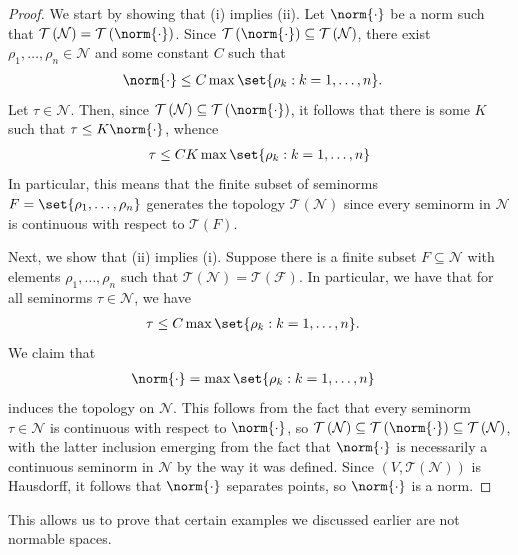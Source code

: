 \documentclass[10pt]{mypackage}
\begin{document}
\begin{proof}
  We start by showing that (i) implies (ii). Let $\norm{\cdot}$ be a norm such that $ \mathcal{T}\left( \mathcal{N} \right) = \mathcal{T}\left( \norm{\cdot} \right) $. Since $ \mathcal{T}\left( \norm{\cdot} \right)\subseteq \mathcal{T}\left( \mathcal{N} \right) $, there exist $\rho_1,\dots,\rho_n\in \mathcal{N}$ and some constant $C$ such that
  \begin{align*}
    \norm{\cdot} &\leq C\max\set{\rho_k : k=1,\dots,n}.
  \end{align*}
  Let $\tau\in \mathcal{N}$. Then, since $ \mathcal{T}\left( \mathcal{N} \right)\subseteq \mathcal{T}\left( \norm{\cdot} \right) $, it follows that there is some $K$ such that $\tau\leq K\norm{\cdot}$, whence 
  \begin{align*}
    \tau\leq CK\max\set{\rho_k : k=1,\dots,n}
  \end{align*}
  In particular, this means that the finite subset of seminorms $F = \set{\rho_1,\dots,\rho_n}$ generates the topology $ \mathcal{T}\left( \mathcal{N} \right) $ since every seminorm in $ \mathcal{N} $ is continuous with respect to $ \mathcal{T}\left( F \right) $.

  Next, we show that (ii) implies (i). Suppose there is a finite subset $F \subseteq \mathcal{N}$ with elements $\rho_1,\dots,\rho_n$ such that $ \mathcal{T}\left( \mathcal{N} \right) = \mathcal{T}\left( \mathcal{F} \right) $. In particular, we have that for all seminorms $ \tau\in \mathcal{N} $, we have
  \begin{align*}
    \tau &\leq C \max\set{\rho_k : k=1,\dots,n}.
  \end{align*}
  We claim that
  \begin{align*}
    \norm{\cdot} &= \max\set{\rho_k : k=1,\dots,n}
  \end{align*}
  induces the topology on $ \mathcal{N} $. This follows from the fact that every seminorm $\tau\in \mathcal{N}$ is continuous with respect to $\norm{\cdot}$, so $ \mathcal{T}\left( \mathcal{N} \right)\subseteq \mathcal{T}\left( \norm{\cdot} \right)\subseteq \mathcal{T}\left( \mathcal{N} \right) $, with the latter inclusion emerging from the fact that $\norm{\cdot}$ is necessarily a continuous seminorm in $ \mathcal{N} $ by the way it was defined. Since $\left( V, \mathcal{T}\left( \mathcal{N} \right)\right)$ is Hausdorff, it follows that $\norm{\cdot}$ separates points, so $\norm{\cdot}$ is a norm.
\end{proof}
This allows us to prove that certain examples we discussed earlier are not normable spaces.
\end{document}
